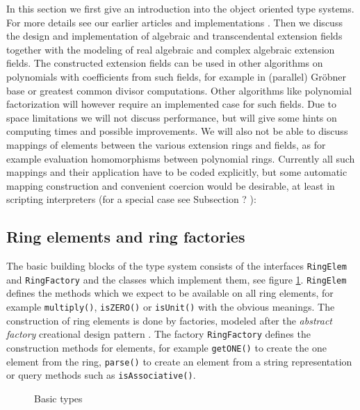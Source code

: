 \documentclass{llncs}
\newcommand{\code}[1]{\texttt{#1}}
\begin{document}
In this section we first give an introduction into the object oriented
type systems. For more details see our earlier articles and implementations
\cite{JollyKredel:2010,Jolly:2010,Kredel:2000,Kredel:2008a,Kredel:2008}. %
Then we discuss the design and implementation of algebraic and
transcendental extension fields together with the modeling of real
algebraic and complex algebraic extension fields. The constructed
extension fields can be used in other algorithms on polynomials with
coefficients from such fields, for example in (parallel) Gr\"obner
base or greatest common divisor computations. Other algorithms like
polynomial factorization will however require an implemented case for
such fields. Due to space limitations we will not discuss performance,
but will give some hints on computing times and possible improvements.
We will also not be able to discuss mappings of elements between the
various extension rings and fields, as for example evaluation
homomorphisms between polynomial rings. Currently all such mappings
and their application have to be coded explicitly, but some automatic
mapping construction and convenient coercion would be desirable, at
least in scripting interpreters (for a special case see Subsection
? ): %


\subsection{Ring elements and ring factories} %

The basic building blocks of the type system consists of the
interfaces \code{RingElem} and \code{RingFactory} and the classes
which implement them, see figure \ref{fig:bastype}. \code{RingElem}
defines the methods which we expect to be available on all ring
elements, for example \code{multiply()},
\code{isZERO()} or \code{isUnit()} with the obvious meanings. The
construction of ring elements is done by factories, modeled after the
{\em abstract factory} creational design pattern \cite{Gamma:1995}.
The factory \code{RingFactory} defines the construction methods for
elements, for example \code{get\-ONE()} to create the one element from
the ring, 
\code{parse()} to create an element from a string representation or query methods such as
\code{is\-Asso\-ciative()}. %

\begin{figure}[thb]
\centering
{}
\caption{Basic types}
\label{fig:bastype}
\end{figure}
\end{document}
